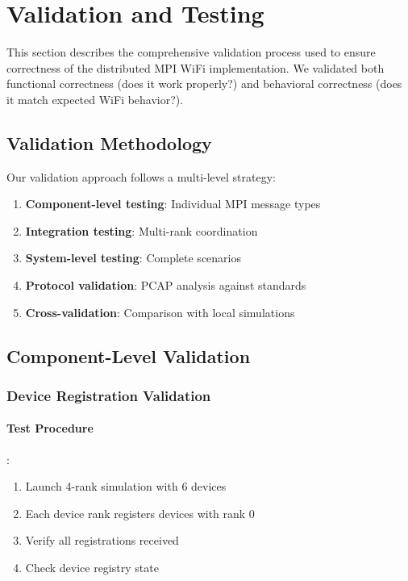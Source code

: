 \section{Validation and Testing}
\label{sec:validation}

This section describes the comprehensive validation process used to ensure correctness of the distributed MPI WiFi implementation. We validated both functional correctness (does it work properly?) and behavioral correctness (does it match expected WiFi behavior?).

\subsection{Validation Methodology}

Our validation approach follows a multi-level strategy:

\begin{enumerate}
    \item \textbf{Component-level testing}: Individual MPI message types
    \item \textbf{Integration testing}: Multi-rank coordination
    \item \textbf{System-level testing}: Complete scenarios
    \item \textbf{Protocol validation}: PCAP analysis against standards
    \item \textbf{Cross-validation}: Comparison with local simulations
\end{enumerate}

\subsection{Component-Level Validation}

\subsubsection{Device Registration Validation}

\paragraph{Test Procedure}:
\begin{enumerate}
    \item Launch 4-rank simulation with 6 devices
    \item Each device rank registers devices with rank 0
    \item Verify all registrations received
    \item Check device registry state
\end{enumerate}

